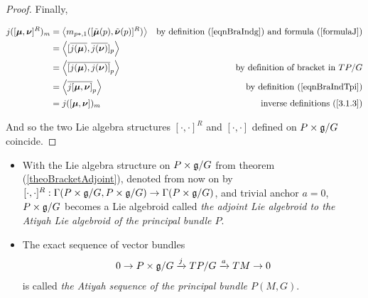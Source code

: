 \begin{proof}
Finally,

\begin{align*}
    j([\bm{\mu}, \bm{\nu}]^R)_m 
    &= \left\langle m_{p*, 1} ([\Tilde{\bm{\mu}}(p), \Tilde{\bm{\nu}}(p)]^R) \right\rangle & \textrm{by definition (\ref{eqnBraIndg}) and formula (\ref{formulaJ})} \\ 
    &= \left\langle [\overline{j(\bm{\mu})}, \overline{j(\bm{\nu})}]_p \right\rangle\\
    &= \left\langle \overline{[j(\bm{\mu}), j(\bm{\nu})]}_p \right\rangle & \textrm{by definition of bracket in $TP/G$}\\
    &= \left\langle \overline{j[\bm{\mu}, \bm{\nu}]}_p \right\rangle & \textrm{by definition (\ref{eqnBraIndTpi})} \\
    &= j([\bm{\mu}, \bm{\nu}])_m & \textrm{inverse definitions (\ref{3.1.3})}
\end{align*}

And so the two Lie algebra structures $[\cdot, \cdot]^R$ and $[\cdot, \cdot]$ defined on $P \times \mathfrak{g}/G$ coincide.

\end{proof}

\begin{definition}\label{AtiyahSeq}
    \begin{itemize}
    
    \item With the Lie algebra structure on $P \times \mathfrak{g}/G$ from theorem (\ref{theoBracketAdjoint}), denoted from now on by $[\cdot, \cdot]^R: \Gamma(P \times \mathfrak{g}/G, P \times \mathfrak{g}/G) \to \Gamma(P \times \mathfrak{g}/G)$, and trivial anchor $a=0$, $P \times \mathfrak{g}/G$ becomes a Lie algebroid called \emph{the adjoint Lie algebroid to the Atiyah Lie algebroid of the principal bundle $P$}.
    
    \item The exact sequence of vector bundles
\begin{align} \label{AtiyahSequence}
    0 \to P \times \mathfrak{g}/G \xrightarrow{j} TP/G \xrightarrow{a} TM \to 0
\end{align}
is called \emph{the Atiyah sequence of the principal bundle $P(M, G)$}.
    
    \end{itemize}


\end{definition}


